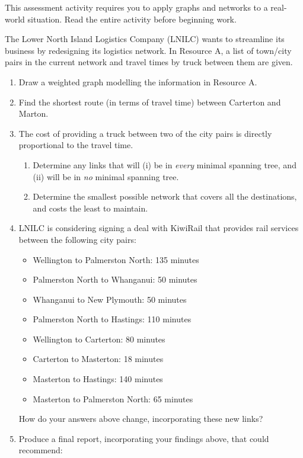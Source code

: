 This assessment activity requires you to apply graphs and networks to a real-world situation. Read the entire activity before
beginning work.

The Lower North Island Logistics Company (LNILC) wants to streamline its business by redesigning its logistics network. In Resource A, a list of
town/city pairs in the current network and travel times by truck between them are given.
\begin{enumerate}
  \item Draw a weighted graph modelling the information in Resource A.
  \item Find the shortest route (in terms of travel time) between Carterton and Marton.
  \item The cost of providing a truck between two of the city pairs is directly proportional to the travel time.
    \begin{enumerate}
      \item Determine any links that will (i) be in \emph{every} minimal spanning tree, and (ii) will be in \emph{no} minimal spanning tree.
      \item Determine the smallest possible network that covers all the destinations, and costs the least to maintain.
    \end{enumerate}
  \item LNILC is considering signing a deal with KiwiRail that provides rail services between the following city pairs:
        \begin{itemize}
          \item Wellington to Palmerston North: 135 minutes
          \item Palmerston North to Whanganui: 50 minutes
          \item Whanganui to New Plymouth: 50 minutes
          \item Palmerston North to Hastings: 110 minutes
          \item Wellington to Carterton: 80 minutes
          \item Carterton to Masterton: 18 minutes
          \item Masterton to Hastings: 140 minutes
          \item Masterton to Palmerston North: 65 minutes
        \end{itemize}
        How do your answers above change, incorporating these new links?
  \item Produce a final report, incorporating your findings above, that could recommend:
        \begin{itemize}

\end{itemize}
\end{enumerate}
